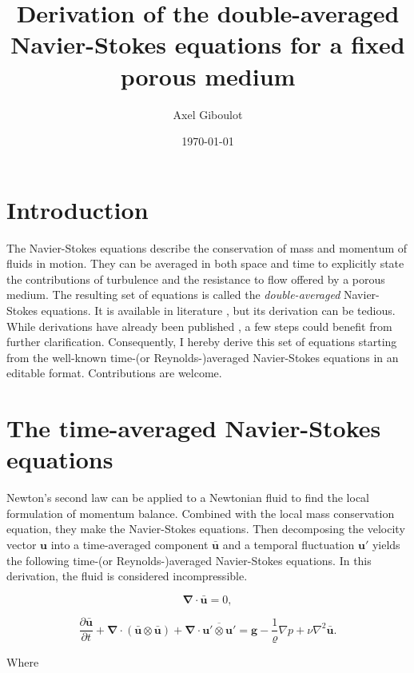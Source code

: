 \documentclass[a4paper,11pt]{article}
\title{Derivation of the double-averaged Navier-Stokes equations for a fixed porous medium}
\author{Axel Giboulot}
\date{\today}
\begin{document}

  \maketitle

{\hypersetup{hidelinks}\tableofcontents}

\clearpage

\section{Introduction}

The Navier-Stokes equations describe the conservation of mass and momentum of fluids in motion.
They can be averaged in both space and time to explicitly state the contributions of turbulence and the resistance to flow offered by a porous medium.
The resulting set of equations is called the \emph{double-averaged} Navier-Stokes equations.
It is available in literature \citep{Nikora2007}, but its derivation can be tedious.
While derivations have already been published \citep{Rousseau2022}, a few steps could benefit from further clarification.
Consequently, I hereby derive this set of equations starting from the well-known time-(or Reynolds-)averaged Navier-Stokes equations in an editable format. Contributions are welcome.

\section{The time-averaged Navier-Stokes equations}

Newton's second law can be applied to a Newtonian fluid to find the local formulation of momentum balance. Combined with the local mass conservation equation, they make the Navier-Stokes equations.
Then decomposing the velocity vector $\bm u$ into a time-averaged component $\bm{\bar u}$ and a temporal fluctuation $\bm u'$ yields the following time-(or Reynolds-)averaged Navier-Stokes equations. In this derivation, the fluid is considered incompressible.

$$\bm\nabla\cdot\bm{\bar u} = 0,$$

$$\frac{\partial\bm{\bar u}}{\partial t} + \bm\nabla\cdot\left(\bm{\bar u}\otimes \bm{\bar u}\right) + \bm\nabla\cdot\overline{\bm u'\otimes\bm u'} = \bm g -\frac{1}{\varrho}\nabla p + \nu\nabla^2\bm{\bar u}.$$

Where
\end{document}
